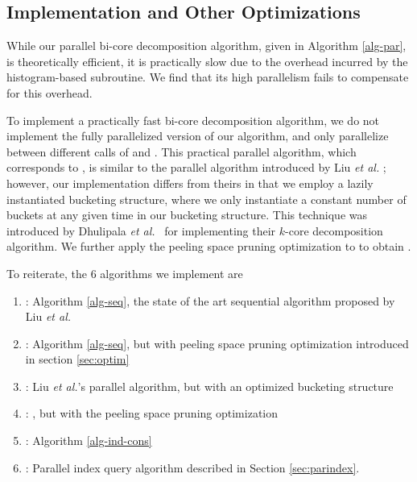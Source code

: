 \subsection{Implementation and Other Optimizations}

While our parallel bi-core decomposition algorithm, given in Algorithm \ref{alg-par}, is theoretically efficient, it is practically slow due to the overhead incurred by the histogram-based  subroutine. We find that its high parallelism fails to compensate for this overhead.

To implement a practically fast bi-core decomposition algorithm, we do not implement the fully parallelized version of our algorithm, and only parallelize between different calls of  and . This practical parallel algorithm, which corresponds to , is similar to the parallel algorithm introduced by Liu \textit{et al.} \cite{Liu2020Efficient}; however, our implementation differs from theirs in that we employ a lazily instantiated bucketing structure, where we only instantiate a constant number of buckets at any given time in our bucketing structure. 
This technique was introduced by Dhulipala \textit{et al.}~\cite{DhBlSh17} for implementing their $k$-core decomposition algorithm. We further apply the peeling space pruning optimization to  to obtain .

To reiterate, the $6$ algorithms we implement are 

\begin{enumerate}
    \item {}: Algorithm \ref{alg-seq}, the state of the art sequential algorithm proposed by Liu \textit{et al.}
    \item {}: Algorithm \ref{alg-seq}, but with peeling space pruning optimization introduced in section \ref{sec:optim}
    \item {}: Liu \textit{et al.}'s parallel algorithm, but with an optimized bucketing structure
    \item {}: , but with the peeling space pruning optimization
    \item {}: Algorithm \ref{alg-ind-cons}
    \item {}: Parallel index query algorithm described in Section \ref{sec:parindex}.
\end{enumerate}

